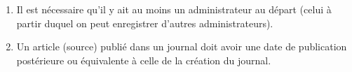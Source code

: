 	\begin{enumerate}
	\item Il est nécessaire qu'il y ait au moins un administrateur au départ (celui à partir duquel on peut enregistrer d'autres administrateurs).
	\item Un article (source) publié dans un journal doit avoir une date de publication postérieure ou équivalente à celle de la création du journal.
	\end{enumerate}